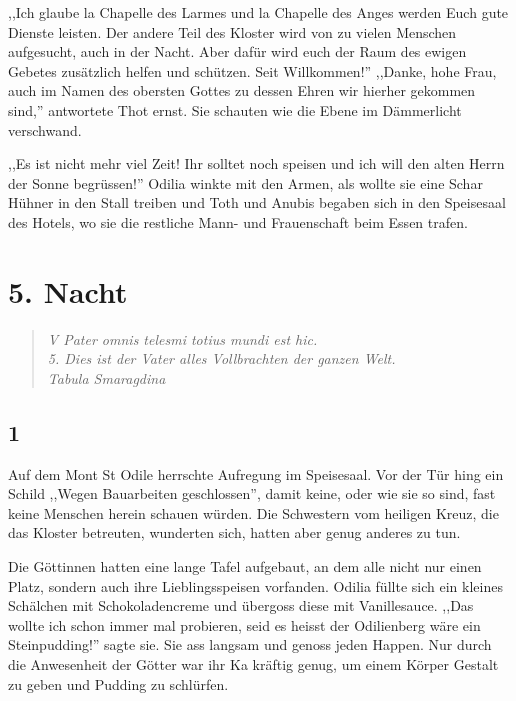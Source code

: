 ,,Ich glaube la Chapelle des Larmes und la Chapelle des Anges werden Euch gute Dienste leisten. Der andere Teil des Kloster wird von zu vielen Menschen aufgesucht, auch in der Nacht. Aber dafür wird euch der Raum des ewigen Gebetes zusätzlich helfen und schützen. Seit Willkommen!'' ,,Danke, hohe Frau, auch im Namen des obersten Gottes zu dessen Ehren wir hierher gekommen sind,'' antwortete Thot ernst. Sie schauten wie die Ebene im Dämmerlicht verschwand.

,,Es ist nicht mehr viel Zeit! Ihr solltet noch speisen und ich will den alten Herrn der Sonne begrüssen!'' Odilia winkte mit den Armen, als wollte sie eine Schar Hühner in den Stall treiben und Toth und Anubis begaben sich in den Speisesaal des Hotels, wo sie die restliche Mann- und Frauenschaft beim Essen trafen.


\chapter*{5. Nacht}

\begin{quotation}

\emph{V Pater omnis telesmi totius mundi est hic.\\5. Dies ist der Vater alles Vollbrachten der ganzen Welt.  \\Tabula Smaragdina}

\end{quotation}

\section*{1}

Auf dem Mont St Odile herrschte Aufregung im Speisesaal. Vor der Tür hing ein Schild ,,Wegen Bauarbeiten geschlossen'', damit keine, oder wie sie so sind, fast keine Menschen herein schauen würden. Die Schwestern vom heiligen Kreuz, die das Kloster betreuten, wunderten sich, hatten aber genug anderes zu tun.

Die Göttinnen hatten eine lange Tafel aufgebaut, an dem alle nicht nur einen Platz, sondern auch ihre Lieblingsspeisen vorfanden. Odilia füllte sich ein kleines Schälchen mit Schokoladencreme und übergoss diese mit Vanillesauce. ,,Das wollte ich schon immer mal probieren, seid es heisst der Odilienberg wäre ein Steinpudding!'' sagte sie. Sie ass langsam und genoss jeden Happen. Nur durch die Anwesenheit der Götter war ihr Ka kräftig genug, um einem Körper Gestalt zu geben und Pudding zu schlürfen.

